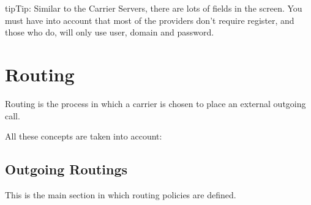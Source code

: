 \documentclass[letterpaper,10pt,english]{sphinxmanual}
\begin{document}
\begin{notice}{tip}{Tip:}
Similar to the Carrier Servers, there are lots of fields in the screen.
You must have into account that most of the providers don't require register,
and those who do, will only use user, domain and password.
\end{notice}


\section{Routing}
\label{administration_portal/brand/routing/index::doc}\label{administration_portal/brand/routing/index:routing}
Routing is the process in which a carrier is chosen to place an external outgoing call.

All these concepts are taken into account:


\subsection{Outgoing Routings}
\label{administration_portal/brand/routing/outgoing_routings:routes-metrics}\label{administration_portal/brand/routing/outgoing_routings::doc}\label{administration_portal/brand/routing/outgoing_routings:outgoing-routings}
This is the main section in which routing policies are defined.
\end{document}
